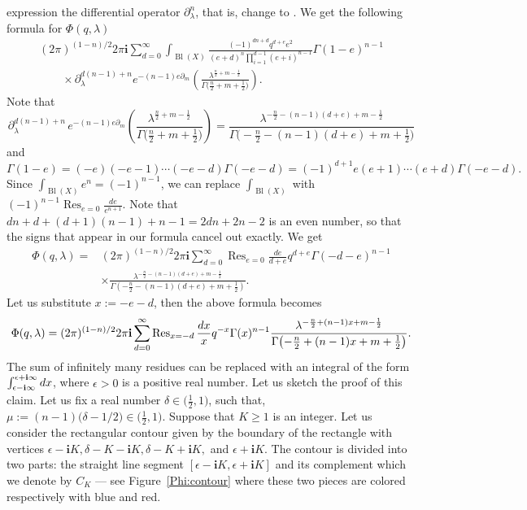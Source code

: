 \documentclass[10pt,a4paper]{article}
\numberwithin{equation}{section}
\newcommand{\ii}{\mathbf{i}}
\begin{document}
expression the differential operator $\partial_\lambda^n$, that is,
change  to . We get the following formula for $\Phi(q,\lambda)$
\begin{gather*}
(2\pi)^{(1-n)/2}
2\pi\ii
\sum_{d=0}^\infty
\int_{\operatorname{Bl}(X)}
\frac{(-1)^{dn+d} q^{d+e} e^2 }{
(e+d)^n
\prod_{i=1}^{d-1}(e +i)^{n-1} }
\Gamma(1-e )^{n-1}\\
\qquad\times
\partial_\lambda^{d(n-1)+n}
e^{-(n-1) e \partial_m}
\left(
\frac{\lambda^{\frac{n}{2}+m-\frac{1}{2} } }{
\Gamma\big( \frac{n}{2}+m+\frac{1}{2} \big) }
\right).
\end{gather*}
Note that
\[
\partial_\lambda^{d(n-1)+n} \,
e^{-(n-1) e \partial_m}
\left(
\frac{\lambda^{\frac{n}{2}+m-\frac{1}{2} } }{
\Gamma\big( \frac{n}{2}+m+\frac{1}{2} \big) }
\right) =
\frac{\lambda^{-\frac{n}{2}-(n-1)(d+e)+m-\frac{1}{2} } }{
\Gamma\big(-\frac{n}{2}-(n-1)(d+e)+m+\frac{1}{2} \big) }
\]
and
\[
\Gamma(1-e) = (-e)(-e-1)\cdots (-e-d)\Gamma(-e-d) = (-1)^{d+1}
e(e+1)\cdots (e+d) \Gamma(-e-d).
\]
Since $\int_{\operatorname{Bl}(X)} e^n = (-1)^{n-1}$, we can replace
$\int_{\operatorname{Bl}(X)}$ with $(-1)^{n-1}\operatorname{Res}_{e=0}
\frac{de}{e^{n+1}}$. Note that $dn+d +(d+1)(n-1) +n-1=2dn+2n-2$ is an
even number, so that the signs that appear in our formula cancel out
exactly. We get
\begin{align*}
\Phi(q,\lambda)={}&
(2\pi)^{(1-n)/2}
2\pi\ii
\sum_{d=0}^\infty
\operatorname{Res}_{e=0}
\frac{de}{d+e}
q^{d+e}\Gamma(-d-e)^{n-1}\\
&\times
\frac{\lambda^{-\frac{n}{2}-(n-1)(d+e)+m-\frac{1}{2} } }{
\Gamma(-\frac{n}{2}-(n-1)(d+e)+m+\frac{1}{2} ) }.
\end{align*}
Let us substitute $x:=-e-d$, then the above formula becomes
\[
\Phi(q,\lambda)=
(2\pi)^{(1-n)/2}
2\pi\ii
\sum_{d=0}^\infty
\operatorname{Res}_{x=-d}
\frac{{\rm d}x}{x}
q^{-x}\Gamma(x)^{n-1}
\frac{\lambda^{-\frac{n}{2}+(n-1)x+m-\frac{1}{2} } }{
\Gamma\bigl(-\frac{n}{2}+(n-1)x+m+\frac{1}{2} \bigr) }.
\]
The sum of infinitely many residues can be replaced with an integral
of the form $\int_{\epsilon-\ii \infty}^{\epsilon+\ii \infty} {\rm d}x$, where $\epsilon >0$ is a positive real number. Let us sketch the proof of this claim. Let us fix a real number
$\delta\in \big(\tfrac{1}{2},1\big)$, such that,
$\mu:=(n-1)\big(\delta-1/2\big)\in \big(\tfrac{1}{2},1\big)$. Suppose that $K\geq 1$ is an integer. Let us consider the rectangular contour given by the boundary of the rectangle with vertices $\epsilon-\ii K, \delta-K-\ii K, \delta-K+\ii K, $ and $\epsilon+\ii K$. The contour is divided into two parts: the straight line segment $[\epsilon-\ii K,\epsilon+\ii K]$ and its complement which we denote by $C_K$ --- see Figure~\ref{Phi:contour} where these two pieces are colored respectively with blue and red.
\end{document}

